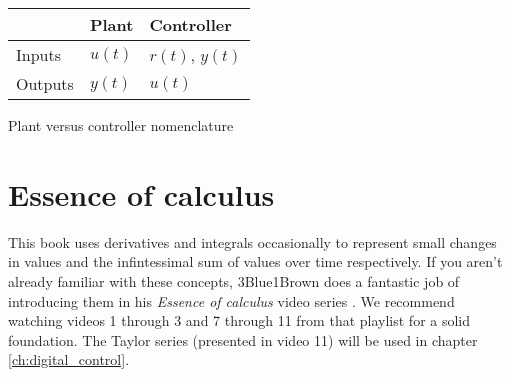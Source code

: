 \begin{booktable}
  \begin{tabular}{|l|ll|}
    \hline
    \rowcolor{headingbg}
    & \textbf{Plant} & \textbf{Controller} \\
    \hline
    Inputs & $u(t)$ & $r(t)$, $y(t)$ \\
    Outputs & $y(t)$ & $u(t)$ \\
    \hline
  \end{tabular}
  \caption{Plant versus controller nomenclature}
  \label{tab:plant_v_controller}
\end{booktable}

\section{Essence of calculus}

This book uses derivatives and integrals occasionally to represent small changes
in values and the infintessimal sum of values over time respectively. If you
aren't already familiar with these concepts, 3Blue1Brown does a fantastic job of
introducing them in his \textit{Essence of calculus} video series
\cite{bib:essence_of_calculus}. We recommend watching videos 1 through 3 and 7
through 11 from that playlist for a solid foundation. The Taylor series
(presented in video 11) will be used in chapter \ref{ch:digital_control}.
